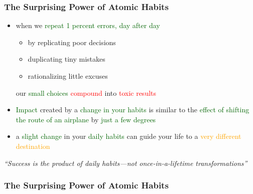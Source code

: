 \documentclass{beamer}
\begin{document}
\begin{frame}
    \frametitle{The Surprising Power of Atomic Habits}
    \begin{itemize}
        \item when we \textcolor{darkgreen}{repeat 1 percent errors, day after day}
        \begin{itemize}
            \item  by replicating poor decisions
            \item  duplicating tiny mistakes
            \item rationalizing little excuses
        \end{itemize}our \textcolor{darkgreen}{small choices} \textcolor{red}{compound} into \textcolor{red}{toxic results}
        \item \textcolor{darkgreen}{Impact} created by a \textcolor{darkgreen}{change in your habits} is similar to the \textcolor{darkgreen}{effect of shifting the route of an airplane} by \textcolor{darkgreen}{just a few degrees}
        \item a \textcolor{darkgreen}{slight change} in your \textcolor{darkgreen}{daily habits} can guide your life to a \textcolor{orange}{very different destination}
    \end{itemize}
    \begin{center}
    {\large \textit{“Success is the product of daily habits—not once-in-a-lifetime transformations”}}  
    \end{center}
    
\end{frame}


\begin{frame}
    \frametitle{The Surprising Power of Atomic Habits}
\end{frame}
\end{document}

